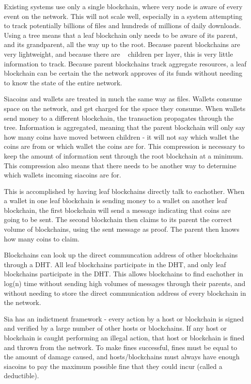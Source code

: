 \documentclass[twocolumn]{article}
\begin{document}
Existing systems use only a single blockchain, where very node is aware of every event on the network.
This will not scale well, especially in a system attempting to track potentially billions of files and hundreds of millions of daily downloads.
Using a tree means that a leaf blockchain only needs to be aware of its parent, and its grandparent, all the way up to the root.
Because parent blockchains are very lightweight, and because there are \childrenperparent ~ children per layer, this is very little information to track.
Because parent blockchains track aggregate resources, a leaf blockchain can be certain the the network approves of its funds without needing to know the state of the entire network.

Siacoins and wallets are treated in much the same way as files.
Wallets consume space on the network, and get charged for the space they consume.
When wallets send money to a different blockchain, the transaction propagates through the tree.
Information is aggregated, meaning that the parent blockchain will only say how many coins have moved between children - it will not say which wallet the coins are from or which wallet the coins are for.
This compression is necessary to keep the amount of information sent through the root blockchain at a minimum.
This compression also means that there needs to be another way to determine which wallets incoming siacoins are for.

This is accomplished by having leaf blockchains directly talk to eachother.
When a wallet in one leaf blockchain is sending money to a wallet on another leaf blockchain, the first blockchain will send a message indicating that coins are going to be sent.
The second blockchain then claims to its parent the correct volume of blockchains, using the sent message as proof.
The parent then knows how many coins to claim.

Blockchains can look up the direct communcation address of other blockchains through a DHT.
All leaf blockchains participate in the DHT, and only leaf blockchains participate in the DHT.
This allows blockchains to find eachother in log(n) time without sending high volumes of messages through their parents, and without needing to store the direct communication address of every blockchain in the network.

Sia has an indictment framework - every action by a host or blockchain is signed and verified by a large number of other hosts or blockchains.
If any host or blockchain is caught performing an illegal action, that host or blockchain is fined and thrown from the network.
To make fines successful, fines must be equal to the amount of damage caused, and hosts/blockchains must always have enough siacoins to pay the maximum possible fine that they could incur (called a deductible).
\end{document}
